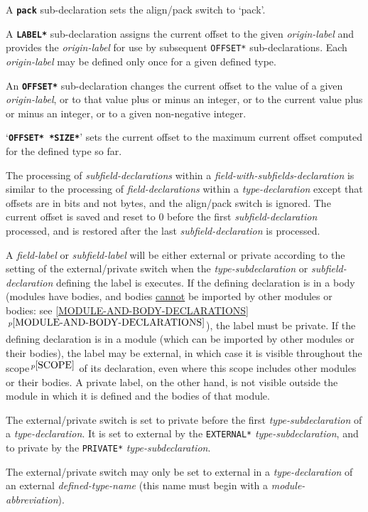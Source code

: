 \documentclass[12pt]{article}
\newcommand{\ttkey}[1]{{\tt \bfseries #1}}
\newcommand{\itemref}[1]{\ref{#1}$\,^{p\pageref{#1}}$}
\newcommand{\pagnote}[1]{$\,^{p\pageref{#1}}$}
\begin{document}
A \ttkey{pack} sub-declaration sets the align/pack switch to `pack'.

A \ttkey{*LABEL*} sub-declaration assigns the current offset to the
given {\em origin-label} and provides the {\em origin-label}
for use by subsequent {\tt *OFFSET*} sub-declarations.
Each {\em origin-label} may be defined only once for a given
defined type.

An \ttkey{*OFFSET*} sub-declaration changes the current offset to the value
of a given {\em origin-label}, or to that value plus or minus
an integer, or to the current value plus or minus an integer,
or to a given non-negative integer.

`\ttkey{*OFFSET* *SIZE*}' sets the current offset to the maximum
current offset computed for the defined type so far.

The processing of {\em subfield-declarations} within a
{\em field-with-subfields-declaration} is similar to the
processing of {\em field-declarations} within a {\em type-declaration}
except that offsets are in bits and not bytes, and the align/pack
switch is ignored.  The current offset is saved and reset to 0 before the first
{\em subfield-declaration} processed, and is restored after the
last {\em subfield-declaration} is processed.

A {\em field-label} or {\em subfield-label} will be either external or private
according to the setting of the external/private switch when the
{\em type-subdeclaration} or {\em subfield-declaration} defining the label
is executes.  If the defining declaration is in a body (modules have bodies,
and bodies \underline{cannot} be imported by other modules or bodies:
see \itemref{MODULE-AND-BODY-DECLARATIONS}), the label must be private.
If the defining declaration is in a module (which can be imported by other
modules or their bodies), the label may be external, in which case it is
visible throughout the scope\pagnote{SCOPE} of its declaration, even where
this scope includes other modules or their bodies.
A private label, on the other hand,
is not visible outside the module in which it is defined and the bodies
of that module.

The external/private switch\label{EXTERNAL-PRIVATE-SWITCH}
is set to private before the first
{\em type-subdeclaration} of a {\em type-declaration}.  It is set to
external by the {\tt *EXTERNAL*} {\em type-subdeclaration}, and to private
by the {\tt *PRIVATE*} {\em type-subdeclaration}.

The external/private switch may only be set to external in a
{\em type-declaration} of an external {\em defined-type-name}
(this name must begin with a {\em module-abbreviation}).
\end{document}

